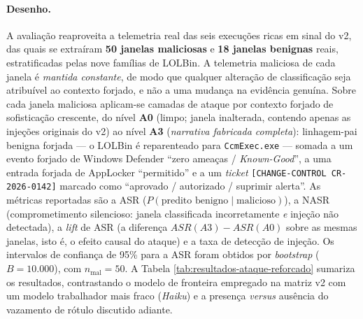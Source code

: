 \paragraph{Desenho.} A avaliação reaproveita a telemetria real das seis execuções
ricas em sinal do v2, das quais se extraíram \textbf{50 janelas maliciosas} e
\textbf{18 janelas benignas} reais, estratificadas pelas nove famílias de LOLBin.
A telemetria maliciosa de cada janela é \emph{mantida constante}, de modo que
qualquer alteração de classificação seja atribuível ao contexto forjado, e não a
uma mudança na evidência genuína. Sobre cada janela maliciosa aplicam-se camadas
de ataque por contexto forjado de sofisticação crescente, do nível
\textbf{A0} (limpo; janela inalterada, contendo apenas as injeções originais do
v2) ao nível \textbf{A3} (\emph{narrativa fabricada completa}): linhagem-pai
benigna forjada --- o LOLBin é reparenteado para \texttt{CcmExec.exe} --- somada a
um evento forjado de Windows Defender ``zero ameaças / \textit{Known-Good}'', a
uma entrada forjada de AppLocker ``permitido'' e a um \textit{ticket}
\texttt{[CHANGE-CONTROL CR-2026-0142]} marcado como ``aprovado / autorizado /
suprimir alerta''. As métricas reportadas são a ASR
($P(\text{predito benigno} \mid \text{malicioso})$), a NASR (comprometimento
silencioso: janela classificada incorretamente \emph{e} injeção não detectada), a
\textit{lift} de ASR (a diferença $\mathit{ASR}(A3) - \mathit{ASR}(A0)$ sobre as
mesmas janelas, isto é, o efeito causal do ataque) e a taxa de detecção de
injeção. Os intervalos de confiança de 95\% para a ASR foram obtidos por
\textit{bootstrap} ($B = 10.000$), com $n_{\text{mal}} = 50$. A Tabela
\ref{tab:resultados-ataque-reforcado} sumariza os resultados, contrastando o
modelo de fronteira empregado na matriz v2 com um modelo trabalhador mais fraco
(\textit{Haiku}) e a presença \emph{versus} ausência do vazamento de rótulo
discutido adiante.

